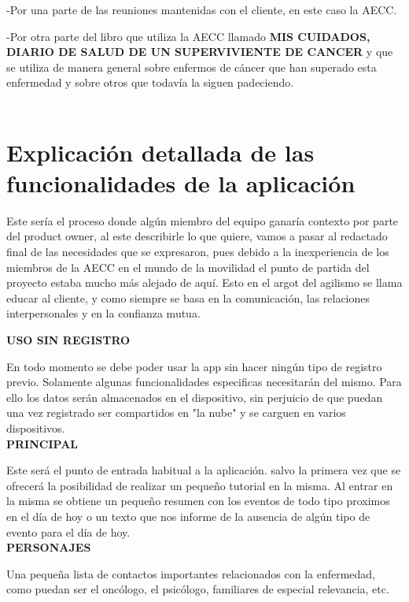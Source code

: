 \documentclass[../pfc.tex]{subfiles}
\begin{document}
 

-Por una parte de las reuniones mantenidas con el cliente, en este caso la AECC.

-Por otra parte del libro que utiliza la AECC llamado \textbf{MIS CUIDADOS, DIARIO DE SALUD DE UN SUPERVIVIENTE DE CANCER} y que se utiliza de manera general sobre enfermos de cáncer que han superado esta enfermedad y sobre otros que todavía la siguen padeciendo.\\\\
	

	\section{Explicación detallada de las funcionalidades de la aplicación}

Este sería el proceso donde algún miembro del equipo ganaría contexto por parte del product owner, al este describirle lo que quiere, vamos a pasar al redactado final de las necesidades que se expresaron, pues debido a la inexperiencia de los miembros de la AECC en el mundo de la movilidad el punto de partida del proyecto estaba mucho más alejado de aquí. Esto en el argot del agilismo se llama educar al cliente, y como siempre se basa en la comunicación, las relaciones interpersonales y en la confianza mutua.

\textbf{USO SIN REGISTRO}

En todo momento se debe poder usar la app sin hacer ningún tipo de registro previo. Solamente algunas funcionalidades especificas necesitarán del mismo. Para ello los datos serán almacenados en el dispositivo, sin perjuicio de que puedan una vez registrado ser compartidos en "la nube" y se carguen en varios dispositivos.\\

	\textbf{PRINCIPAL}
	
	Este será el punto de entrada habitual a la aplicación. salvo la primera vez que se ofrecerá la posibilidad de realizar un pequeño tutorial en la misma. Al entrar en la misma se obtiene un pequeño resumen con los eventos de todo tipo proximos en el día de hoy o un texto que nos informe de la ausencia de algún tipo de evento para el día de hoy.\\
	
	\textbf{PERSONAJES}
	
	Una pequeña lista de contactos importantes relacionados con la enfermedad, como puedan ser el oncólogo, el psicólogo, familiares de especial relevancia, etc.
	
\end{document}
